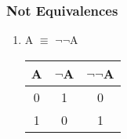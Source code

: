 \documentclass[12pt]{article}
\begin{document}
\subsubsection{Not Equivalences}
\begin{enumerate}

  \item A $\equiv$ $\neg$$\neg$A

\begin{center}
  \begin{tabular}{| c | c | c |}
    \hline
    A & $\neg$A & $\neg$$\neg$A \\ \hline
    0 & 1 & 0 \\
    1 & 0 & 1 \\ \hline
  \end{tabular}
\end{center}

\end{enumerate}
\end{document}
